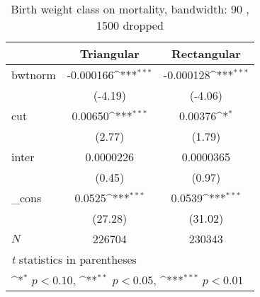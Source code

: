 \begin{table}[htbp]\centering
\def\sym#1{\ifmmode^{#1}\else\(^{#1}\)\fi}
\caption{Birth weight class on mortality, bandwidth: 90 , 1500 dropped}
\begin{tabular}{l*{2}{c}}
\hline\hline
            &\multicolumn{1}{c}{Triangular}&\multicolumn{1}{c}{Rectangular}\\
\hline
bwtnorm     &   -0.000166\sym{***}&   -0.000128\sym{***}\\
            &     (-4.19)         &     (-4.06)         \\
[1em]
cut         &     0.00650\sym{***}&     0.00376\sym{*}  \\
            &      (2.77)         &      (1.79)         \\
[1em]
inter       &   0.0000226         &   0.0000365         \\
            &      (0.45)         &      (0.97)         \\
[1em]
\_cons      &      0.0525\sym{***}&      0.0539\sym{***}\\
            &     (27.28)         &     (31.02)         \\
\hline
\(N\)       &      226704         &      230343         \\
\hline\hline
\multicolumn{3}{l}{\footnotesize \textit{t} statistics in parentheses}\\
\multicolumn{3}{l}{\footnotesize \sym{*} \(p<0.10\), \sym{**} \(p<0.05\), \sym{***} \(p<0.01\)}\\
\end{tabular}
\end{table}
